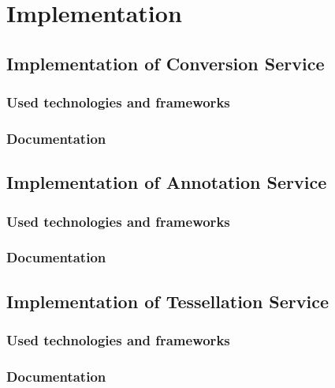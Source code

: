 \chapter{Implementation}
\section{Implementation of Conversion Service}
\subsection{Used technologies and frameworks}
\subsection{Documentation}
\section{Implementation of Annotation Service}
\subsection{Used technologies and frameworks}
\subsection{Documentation}
\section{Implementation of Tessellation Service}
\subsection{Used technologies and frameworks}
\subsection{Documentation}